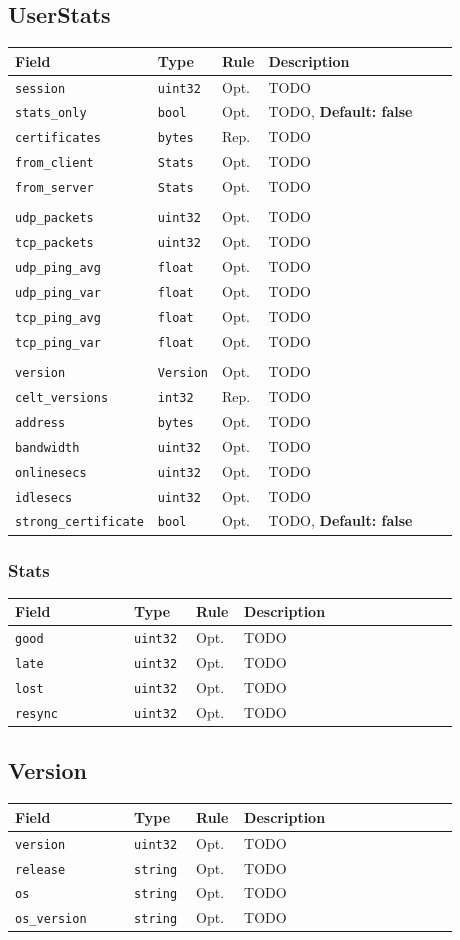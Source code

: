 \documentclass[11pt]{article} %
\newenvironment{mumbleMessageEx}
{%
	\small
	\renewcommand\arraystretch{1.5}
	\begin{tabular}{p{0.25\linewidth}p{0.13\linewidth}p{0.05\linewidth}p{0.45\linewidth}}
	Field & Type & Rule & Description \\
	\hline
}
{%
	\end{tabular}
	\renewcommand\arraystretch{1.0}
}
\newcommand{\mumbleMessageExItem}[4]{ \texttt{#1} & \texttt{#2} & #3 & #4 \\ }
\begin{document}
\subsection{UserStats}

\begin{mumbleMessageEx}
\mumbleMessageExItem{session}{uint32}{Opt.}{TODO}
\mumbleMessageExItem{stats\_only}{bool}{Opt.}{TODO, \textbf{Default: false}}
\mumbleMessageExItem{certificates}{bytes}{Rep.}{TODO}
\mumbleMessageExItem{from\_client}{Stats}{Opt.}{TODO}
\mumbleMessageExItem{from\_server}{Stats}{Opt.}{TODO}
\\
\mumbleMessageExItem{udp\_packets}{uint32}{Opt.}{TODO}
\mumbleMessageExItem{tcp\_packets}{uint32}{Opt.}{TODO}
\mumbleMessageExItem{udp\_ping\_avg}{float}{Opt.}{TODO}
\mumbleMessageExItem{udp\_ping\_var}{float}{Opt.}{TODO}
\mumbleMessageExItem{tcp\_ping\_avg}{float}{Opt.}{TODO}
\mumbleMessageExItem{tcp\_ping\_var}{float}{Opt.}{TODO}
\\
\mumbleMessageExItem{version}{Version}{Opt.}{TODO}
\mumbleMessageExItem{celt\_versions}{int32}{Rep.}{TODO}
\mumbleMessageExItem{address}{bytes}{Opt.}{TODO}
\mumbleMessageExItem{bandwidth}{uint32}{Opt.}{TODO}
\mumbleMessageExItem{onlinesecs}{uint32}{Opt.}{TODO}
\mumbleMessageExItem{idlesecs}{uint32}{Opt.}{TODO}
\mumbleMessageExItem{strong\_certificate}{bool}{Opt.}{TODO, \textbf{Default: false}}
\end{mumbleMessageEx}

\subsubsection{Stats}

\begin{mumbleMessageEx}
\mumbleMessageExItem{good}{uint32}{Opt.}{TODO}
\mumbleMessageExItem{late}{uint32}{Opt.}{TODO}
\mumbleMessageExItem{lost}{uint32}{Opt.}{TODO}
\mumbleMessageExItem{resync}{uint32}{Opt.}{TODO}
\end{mumbleMessageEx}

\subsection{Version}

\begin{mumbleMessageEx}
\mumbleMessageExItem{version}{uint32}{Opt.}{TODO}
\mumbleMessageExItem{release}{string}{Opt.}{TODO}
\mumbleMessageExItem{os}{string}{Opt.}{TODO}
\mumbleMessageExItem{os\_version}{string}{Opt.}{TODO}
\end{mumbleMessageEx}
\end{document}
